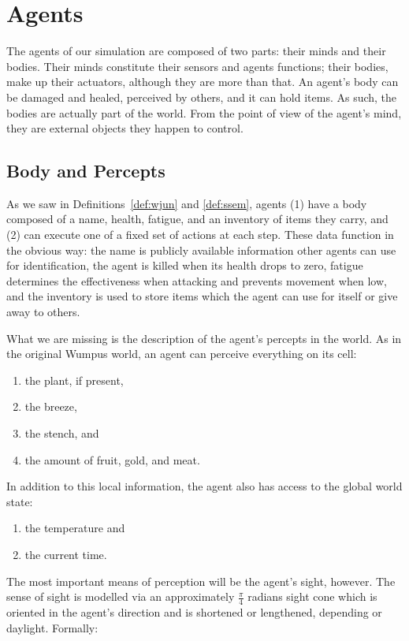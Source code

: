 \section{Agents}

The agents of our simulation are composed of two parts: their minds and their bodies. Their minds constitute their sensors and agents functions; their bodies, make up their actuators, although they are more than that. An agent's body can be damaged and healed, perceived by others, and it can hold items. As such, the bodies are actually part of the world. From the point of view of the agent's mind, they are external objects they happen to control.

\subsection{Body and Percepts}

As we saw in Definitions~\ref{def:wjun} and \ref{def:ssem}, agents (1) have a body composed of a name, health, fatigue, and an inventory of items they carry, and (2) can execute one of a fixed set of actions at each step. These data function in the obvious way: the name is publicly available information other agents can use for identification, the agent is killed when its health drops to zero, fatigue determines the effectiveness when attacking and prevents movement when low, and the inventory is used to store items which the agent can use for itself or give away to others.

What we are missing is the description of the agent's percepts in the world. As in the original Wumpus world, an agent can perceive everything on its cell:
	\begin{enumerate}
		\item the plant, if present,
		\item the breeze,
		\item the stench, and
		\item the amount of fruit, gold, and meat.
	\end{enumerate}
	
In addition to this local information, the agent also has access to the global world state:
	\begin{enumerate}
		\item the temperature and
		\item the current time.
	\end{enumerate}
The most important means of perception will be the agent's sight, however. The sense of sight is modelled via an approximately $\frac{\pi}{4}$ radians sight cone which is oriented in the agent's direction and is shortened or lengthened, depending or daylight. Formally:

